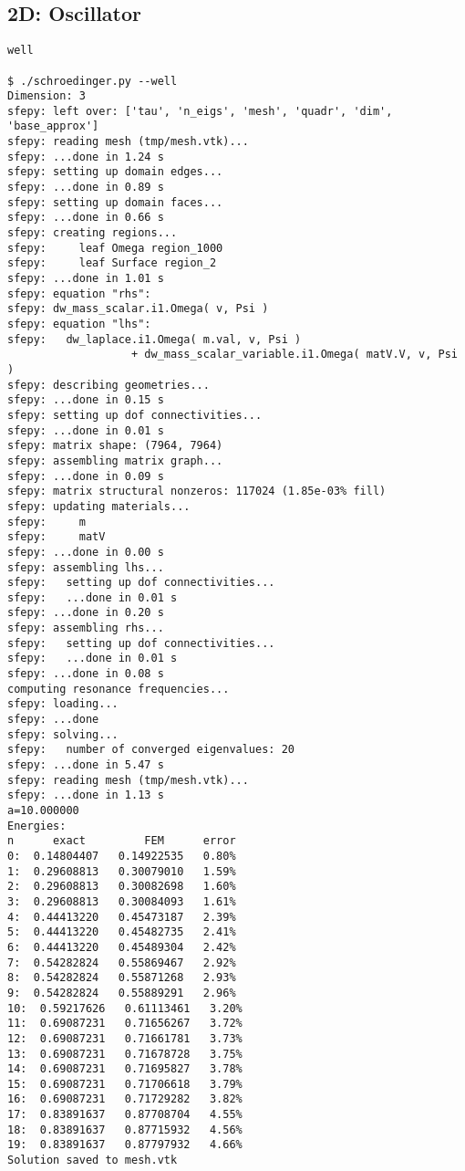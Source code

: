 \subsection{2D: Oscillator}

\begin{lstlisting}
well

$ ./schroedinger.py --well
Dimension: 3
sfepy: left over: ['tau', 'n_eigs', 'mesh', 'quadr', 'dim', 'base_approx']
sfepy: reading mesh (tmp/mesh.vtk)...
sfepy: ...done in 1.24 s
sfepy: setting up domain edges...
sfepy: ...done in 0.89 s
sfepy: setting up domain faces...
sfepy: ...done in 0.66 s
sfepy: creating regions...
sfepy:     leaf Omega region_1000
sfepy:     leaf Surface region_2
sfepy: ...done in 1.01 s
sfepy: equation "rhs":
sfepy: dw_mass_scalar.i1.Omega( v, Psi )
sfepy: equation "lhs":
sfepy:   dw_laplace.i1.Omega( m.val, v, Psi )
                   + dw_mass_scalar_variable.i1.Omega( matV.V, v, Psi )
sfepy: describing geometries...
sfepy: ...done in 0.15 s
sfepy: setting up dof connectivities...
sfepy: ...done in 0.01 s
sfepy: matrix shape: (7964, 7964)
sfepy: assembling matrix graph...
sfepy: ...done in 0.09 s
sfepy: matrix structural nonzeros: 117024 (1.85e-03% fill)
sfepy: updating materials...
sfepy:     m
sfepy:     matV
sfepy: ...done in 0.00 s
sfepy: assembling lhs...
sfepy:   setting up dof connectivities...
sfepy:   ...done in 0.01 s
sfepy: ...done in 0.20 s
sfepy: assembling rhs...
sfepy:   setting up dof connectivities...
sfepy:   ...done in 0.01 s
sfepy: ...done in 0.08 s
computing resonance frequencies...
sfepy: loading...
sfepy: ...done
sfepy: solving...
sfepy:   number of converged eigenvalues: 20
sfepy: ...done in 5.47 s
sfepy: reading mesh (tmp/mesh.vtk)...
sfepy: ...done in 1.13 s
a=10.000000
Energies:
n      exact         FEM      error
0:  0.14804407   0.14922535   0.80%
1:  0.29608813   0.30079010   1.59%
2:  0.29608813   0.30082698   1.60%
3:  0.29608813   0.30084093   1.61%
4:  0.44413220   0.45473187   2.39%
5:  0.44413220   0.45482735   2.41%
6:  0.44413220   0.45489304   2.42%
7:  0.54282824   0.55869467   2.92%
8:  0.54282824   0.55871268   2.93%
9:  0.54282824   0.55889291   2.96%
10:  0.59217626   0.61113461   3.20%
11:  0.69087231   0.71656267   3.72%
12:  0.69087231   0.71661781   3.73%
13:  0.69087231   0.71678728   3.75%
14:  0.69087231   0.71695827   3.78%
15:  0.69087231   0.71706618   3.79%
16:  0.69087231   0.71729282   3.82%
17:  0.83891637   0.87708704   4.55%
18:  0.83891637   0.87715932   4.56%
19:  0.83891637   0.87797932   4.66%
Solution saved to mesh.vtk

\end{lstlisting}


